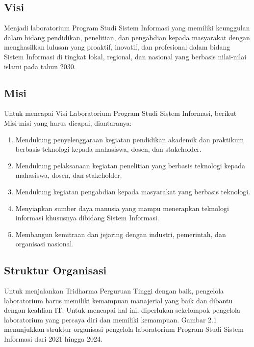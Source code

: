 \subsection{Visi}
Menjadi laboratorium Program Studi Sistem Informasi yang memiliki keunggulan dalam bidang pendidikan, penelitian, dan pengabdian kepada masyarakat dengan menghasilkan lulusan yang proaktif, inovatif, dan profesional dalam bidang Sistem Informasi di tingkat lokal, regional, dan nasional yang berbasis nilai-nilai islami pada tahun 2030.
\subsection{Misi}
Untuk mencapai Visi Laboratorium Program Studi Sistem Informasi, berikut Misi-misi yang harus dicapai, diantaranya:

\begin{enumerate}

	\item Mendukung penyelenggaraan kegiatan pendidikan akademik dan praktikum berbasis teknologi kepada mahasiswa, dosen, dan stakeholder.
	\item Mendukung pelaksanaan kegiatan penelitian yang berbasis teknologi kepada mahasiswa, dosen, dan stakeholder.
	\item Mendukung kegiatan pengabdian kepada masyarakat yang berbasis teknologi.
	\item Menyiapkan sumber daya manusia yang mampu menerapkan teknologi informasi khususnya dibidang Sistem Informasi.
	\item Membangun kemitraan dan jejaring dengan industri, pemerintah, dan organisasi nasional.

\end{enumerate}
\subsection{Struktur Organisasi}
Untuk menjalankan Tridharma Perguruan Tinggi dengan baik, pengelola laboratorium harus memiliki kemampuan manajerial yang baik dan dibantu dengan keahlian IT. Untuk mencapai hal ini, diperlukan sekelompok pengelola laboratorium yang percaya diri dan memiliki kemampuan. Gambar 2.1 menunjukkan struktur organisasi pengelola laboratorium Program Studi Sistem Informasi dari 2021 hingga 2024.

